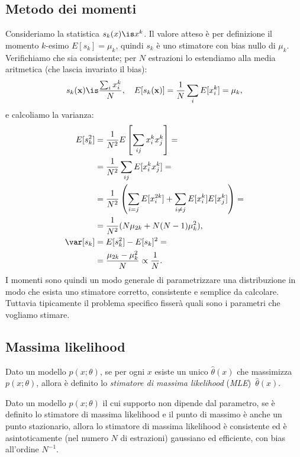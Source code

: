 
\subsection{Metodo dei momenti}

Consideriamo la statistica $s_k(x)\is x^k$.
Il valore atteso è per definizione il momento $k$-esimo
$E[s_k]=\mu_k$,
quindi $s_k$ è uno stimatore con bias nullo di $\mu_k$.
Verifichiamo che sia consistente;
per $N$ estrazioni lo estendiamo alla media aritmetica (che lascia invariato il bias):
\begin{align*}
	s_k(\mathbf x)
	\is \frac{\sum_i x_i^k}N, \quad
	E[s_k(\mathbf x)]
	= \frac1N \sum_i E[x_i^k]
	= \mu_k,
\end{align*}
e calcoliamo la varianza:
\begin{align*}
	E[s_k^2]
	&= \frac1{N^2} E \left[ \sum_{ij} x_i^k x_j^k \right] = \\
	&= \frac1{N^2} \sum_{ij} E[x_i^k x_j^k] = \\
	&= \frac1{N^2} \left( \sum_{i=j} E[x_i^{2k}] + \sum_{i\neq j} E[x_i^k] E[x_j^k] \right) = \\
	&= \frac1{N^2} (N\mu_{2k} + N(N-1)\mu_k^2), \\
	\var[s_k]
	&= E[s_k^2] - E[s_k]^2 = \\
	&= \frac{\mu_{2k} - \mu_k^2}N
	\propto \frac1N.
\end{align*}
I momenti sono quindi un modo generale di parametrizzare una distribuzione in modo che esista uno stimatore corretto, consistente e semplice da calcolare.
Tuttavia tipicamente il problema specifico fisserà quali sono i parametri che vogliamo stimare.

\subsection{Massima likelihood}
\label{sec:ml}

\begin{definition}
	Dato un modello $p(x;\theta)$,
	se per ogni $x$ esiste un unico $\hat\theta(x)$ che massimizza $p(x;\theta)$,
	allora è definito lo \emph{stimatore di massima likelihood} (\emph{MLE})~$\hat\theta(x)$.
\end{definition}

\begin{theorem}
	\label{teo:mle}
	Dato un modello $p(x;\theta)$ il cui supporto non dipende dal parametro,
	se è definito lo stimatore di massima likelihood
	e il punto di massimo è anche un punto stazionario,
	allora lo stimatore di massima likelihood è consistente
	ed è asintoticamente (nel numero $N$ di estrazioni) gaussiano ed efficiente,
	con bias all'ordine $N^{-1}$.
\end{theorem}

